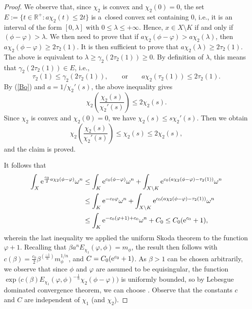 \documentclass[11pt]{article}
\numberwithin{equation}{section}
\numberwithin{equation}{section}
\theoremstyle{plain}
\begin{document}
\begin{proof}
We observe that, since $\chi_2$ is convex and $\chi_2(0) = 0$, the set $E:=\{ t \in \mathbb{R}^+ \colon a\chi_2(t) \leq 2 t \}$ is a~closed convex set containing $0$, i.e., it is an interval of the form $[0, \lambda]$ with $0 \leq \lambda \leq + \infty$. Hence, $x\in X\setminus K$ if and only if $(\phi-\varphi)>\lambda$.
We then need to prove that if $ a\chi_2( \phi - \varphi) > a\chi_2( \lambda)$,
then
$ a \chi_2( \phi - \varphi) \geq {2 \tau_2(1)}$. It is then sufficient to prove that $a\chi_2( \lambda) \geq 2 \tau_2(1)$. The above is equivalent to $ \lambda \geq \gamma_2(2 \tau_2(1)) \geq 0$. By definition of $\lambda$, this means that $\gamma_2(2 \tau_2(1))\in E$, i.e.,
\[\tau_2(1) \leq \gamma_2(2 \tau_2(1)),\qquad \text{or} \qquad a \chi_2(\tau_2(1)) \leq 2 \tau_2(1).\]
By (\ref{Bo}) and $a=1/\chi_2'(s)$, the above inequality gives
\[\chi_2\left(\frac{\chi_2( s)}{\chi_2' (s)} \right) \leq 2 \chi_2(s).\]
Since $\chi_2$ is convex and $\chi_2(0) = 0$, we have
$\chi_2(s) \leq s \chi_2'(s)$.
Then we obtain
\[ \chi_2\left(\frac{\chi_2( s)}{\chi_2' (s)} \right) \leq \chi_2(s) \leq 2 \chi_2(s),\]
and the claim is proved.

It follows that
\begin{align*}%
\int_X {\rm e}^{\frac{c_0}{2} a \chi_2(\phi-\varphi)} \omega^n &\leq \int_K {\rm e}^{c_0 (\phi-\varphi)} \omega^n + \int_{X\setminus K}{\rm e}^{c_0(a\chi_2(\phi-\varphi) -\tau_2(1))} \omega^n\\
 &\leq \int_K {\rm e}^{-c_0 \varphi} \omega^n + \int_{X\setminus K}{\rm e}^{c_0(a\chi_2(\phi-\varphi) -\tau_2(1))} \omega^n \\
 &\leq\int_K {\rm e}^{-c_0 (\varphi+1)+c_0} \omega^n + C_0\leq C_0({\rm e}^{c_0}+1),
\end{align*}
wherein the last inequality we applied the uniform Skoda theorem to the function $\varphi + 1$. Recalling that $\beta a^n E_{\chi_1}(\varphi, \phi) = m_\phi$, the result then follows with
$c(\beta) = \frac{c_0}{2} \beta^{(\frac{-1}{n})}m_\phi^{1/n}$, and $C= C_0({\rm e}^{c_0}+1)$.
As $\beta>1$ can be chosen arbitrarily, we observe that since $\phi$ and $\varphi$ are assumed to be equisingular, the function $\exp \big( c(\beta) E_{\chi_1}(\varphi, \phi)^{-\frac{1}{n}} \chi_2(\phi-\varphi)\big)$ is uniformly bounded, so by Lebesgue dominated convergence theorem, we can choose .
Observe that the constants $c$ and $C$ are independent of $\chi_1$ (and $\chi_2$).
\end{proof}
\end{document}
